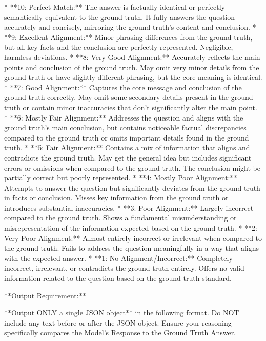\begin{tcolorbox}[colback=cadmiumgreen!5!white,colframe=forestgreen!75!white,breakable,title=\textit{LLM judge prompt for the PubMedQA free-form QA task.}]
\begin{VerbatimWrap}
*   **10: Perfect Match:** The answer is factually identical or perfectly semantically equivalent to the ground truth. It fully answers the question accurately and concisely, mirroring the ground truth's content and conclusion.
*   **9: Excellent Alignment:** Minor phrasing differences from the ground truth, but all key facts and the conclusion are perfectly represented. Negligible, harmless deviations.
*   **8: Very Good Alignment:** Accurately reflects the main points and conclusion of the ground truth. May omit very minor details from the ground truth or have slightly different phrasing, but the core meaning is identical.
*   **7: Good Alignment:** Captures the core message and conclusion of the ground truth correctly. May omit some secondary details present in the ground truth or contain minor inaccuracies that don't significantly alter the main point.
*   **6: Mostly Fair Alignment:** Addresses the question and aligns with the ground truth's main conclusion, but contains noticeable factual discrepancies compared to the ground truth or omits important details found in the ground truth.
*   **5: Fair Alignment:** Contains a mix of information that aligns and contradicts the ground truth. May get the general idea but includes significant errors or omissions when compared to the ground truth. The conclusion might be partially correct but poorly represented.
*   **4: Mostly Poor Alignment:** Attempts to answer the question but significantly deviates from the ground truth in facts or conclusion. Misses key information from the ground truth or introduces substantial inaccuracies.
*   **3: Poor Alignment:** Largely incorrect compared to the ground truth. Shows a fundamental misunderstanding or misrepresentation of the information expected based on the ground truth.
*   **2: Very Poor Alignment:** Almost entirely incorrect or irrelevant when compared to the ground truth. Fails to address the question meaningfully in a way that aligns with the expected answer.
*   **1: No Alignment/Incorrect:** Completely incorrect, irrelevant, or contradicts the ground truth entirely. Offers no valid information related to the question based on the ground truth standard.

**Output Requirement:**

**Output ONLY a single JSON object** in the following format. Do NOT include any text before or after the JSON object. Ensure your reasoning specifically compares the Model's Response to the Ground Truth Answer.


\end{VerbatimWrap}
\end{tcolorbox}
